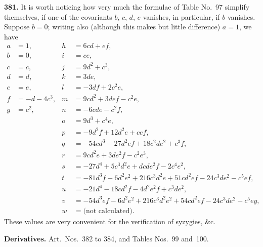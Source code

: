 \documentclass[11pt,a4paper]{book}
\begin{document}
\noindent\textbf{381.} It is worth noticing how very much the formulae of Table No.~97 simplify themselves, if one of the covariants $b$, $c$, $d$, $e$ vanishes, in particular, if $b$ vanishes. Suppose $b = 0$; writing also (although this makes but little difference) $a = 1$, we have
\begin{align*}
a &= 1, & h &= 6cd + ef, \\
b &= 0, & i &= ce, \\
c &= c, & j &= 9d^2 + c^3, \\
d &= d, & k &= 3de, \\
e &= e, & l &= -3df + 2c^2 e, \\
f &= -d - 4c^3, & m &= 9cd^2 + 3def - c^2 e, \\
g &= c^2, & n &= -6cde - c^2 f, \\
& & o &= 9d^3 + c^4 e, \\
& & p &= -9d^2 f + 12d^2 e + cef, \\
& & q &= -54cd^3 - 27d^2 ef + 18c^2 de^2 + c^3 f, \\
& & r &= 9cd^2 e + 3de^2 f - c^2 e^3, \\
& & s &= -27d^4 + 5c^3 d^2 e + dcde^2 f - 2c^4 e^2, \\
& & t &= -81d^3 f - 6d^2 e^2 + 216c^3 d^2 e + 51cd^2 ef - 24c^3 de^2 - c^5 ef, \\
& & u &= -21d^4 - 18cd^2 f - 4d^2 e^2 f + c^3 de^2, \\
& & v &= -54d^3 ef - 6d^2 e^2 + 216c^3 d^2 e^2 + 54cd^2 ef - 24c^3 de^2 - c^5 ey, \\
& & w &= \text{(not calculated)}.
\end{align*}
These values are very convenient for the verification of syzygies, \&c.

\newpage
\noindent\textbf{Derivatives.} Art.\ Nos.\ 382 to 384, and Tables Nos.~99 and~100.

\medskip
\end{document}
